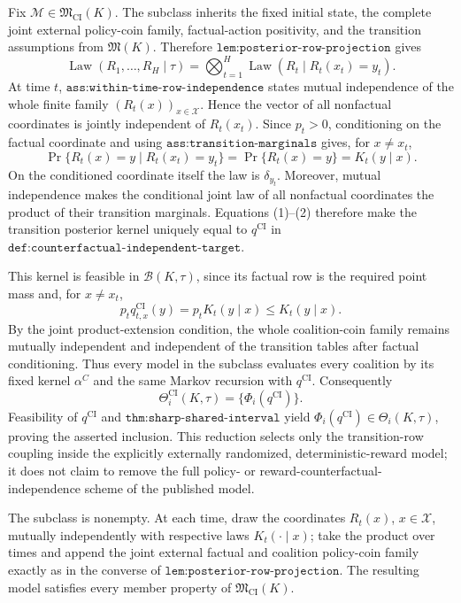 Fix \(\mathcal M\in\mathfrak M_{\mathrm{CI}}(K)\).  The subclass inherits the fixed initial state, the complete joint external policy-coin family, factual-action positivity, and the transition assumptions from \(\mathfrak M(K)\).  Therefore \(\texttt{lem:posterior-row-projection}\) gives
\[
 \operatorname{Law}(R_1,\ldots,R_H\mid\tau)
 =\bigotimes_{t=1}^H\operatorname{Law}(R_t\mid R_t(x_t)=y_t). \tag{1}
\]
At time \(t\), \(\texttt{ass:within-time-row-independence}\) states mutual independence of the whole finite family \((R_t(x))_{x\in\mathcal X}\).  Hence the vector of all nonfactual coordinates is jointly independent of \(R_t(x_t)\).  Since \(p_t>0\), conditioning on the factual coordinate and using \(\texttt{ass:transition-marginals}\) gives, for \(x\ne x_t\),
\[
 \Pr\{R_t(x)=y\mid R_t(x_t)=y_t\}
 =\Pr\{R_t(x)=y\}=K_t(y\mid x). \tag{2}
\]
On the conditioned coordinate itself the law is \(\delta_{y_t}\).  Moreover, mutual independence makes the conditional joint law of all nonfactual coordinates the product of their transition marginals.  Equations (1)--(2) therefore make the transition posterior kernel uniquely equal to \(q^{\mathrm{CI}}\) in \(\texttt{def:counterfactual-independent-target}\).

This kernel is feasible in \(\mathcal B(K,\tau)\), since its factual row is the required point mass and, for \(x\ne x_t\),
\[
 p_tq_{t,x}^{\mathrm{CI}}(y)=p_tK_t(y\mid x)\le K_t(y\mid x).
\]
By the joint product-extension condition, the whole coalition-coin family remains mutually independent and independent of the transition tables after factual conditioning.  Thus every model in the subclass evaluates every coalition by its fixed kernel \(\alpha^C\) and the same Markov recursion with \(q^{\mathrm{CI}}\).  Consequently
\[
 \Theta_i^{\mathrm{CI}}(K,\tau)=\{\Phi_i(q^{\mathrm{CI}})\}.
\]
Feasibility of \(q^{\mathrm{CI}}\) and \(\texttt{thm:sharp-shared-interval}\) yield \(\Phi_i(q^{\mathrm{CI}})\in\Theta_i(K,\tau)\), proving the asserted inclusion.  This reduction selects only the transition-row coupling inside the explicitly externally randomized, deterministic-reward model; it does not claim to remove the full policy- or reward-counterfactual-independence scheme of the published model.

The subclass is nonempty.  At each time, draw the coordinates \(R_t(x)\), \(x\in\mathcal X\), mutually independently with respective laws \(K_t(\cdot\mid x)\); take the product over times and append the joint external factual and coalition policy-coin family exactly as in the converse of \(\texttt{lem:posterior-row-projection}\).  The resulting model satisfies every member property of \(\mathfrak M_{\mathrm{CI}}(K)\).

